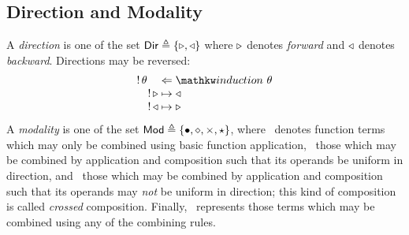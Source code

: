 \documentclass{amsart}
\begin{document}
\subsection{Direction and Modality}
A \emph{direction} is one of the set
$\mathsf{Dir}\triangleq\{\mathsf{\triangleright},\mathsf{\triangleleft}\}$ where $\mathsf{\triangleright}$
denotes \emph{forward} and $\mathsf{\triangleleft}$ denotes \emph{backward}.  Directions may
be reversed:
\[
  \arraycolsep=1.4pt
  \begin{array}{lcl}
    !\,\theta &\Leftarrow &\induction\theta\\
    \quad!\,\con\triangleright &\mapsto &\triangleleft\\
    \quad!\,\con\triangleleft &\mapsto &\triangleright
  \end{array}
\]
A \emph{modality} is one of the set $\mathsf{Mod}\triangleq\{\mathsf{\bullet}, \mathsf{\diamond},
\mathsf{\times}, \mathsf{\star}\}$, where \con\bullet\ denotes function terms
which may only be combined using basic function application,
\con\diamond\ those which may be combined by application and
composition such that its operands be uniform in direction, and
\con\times\ those which may be combined by application and composition
such that its operands may \emph{not} be uniform in direction; this kind
of composition is called \emph{crossed} composition. Finally, \con\star\
represents those terms which may be combined using any of the combining
rules.
\end{document}
